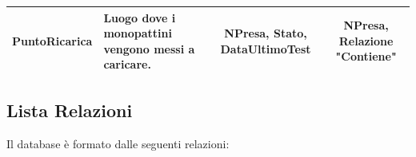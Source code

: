 \documentclass[11pt,a4paper]{article}
\renewcommand{\tabularxcolumn}[1]{m{#1}}
\begin{document}
\begin{tabularx}{\linewidth}{| C{0.85} | L{1.10} | C{0.95} | C{0.90} |}
    \textbf{PuntoRicarica}                                                                                                  &
    Luogo dove i monopattini vengono messi a caricare.                                                                      &
    NPresa, Stato, DataUltimoTest                                                                                           &
    NPresa, Relazione "Contiene"                                                                                                                                                                  \\ \hline
\end{tabularx}
\newpage

\subsection{Lista Relazioni}
Il database è formato dalle seguenti relazioni:

\setlength{\tabcolsep}{4pt}

\keepXColumns

\renewcommand{\tabularxcolumn}[1]{m{#1}}
\end{document}
